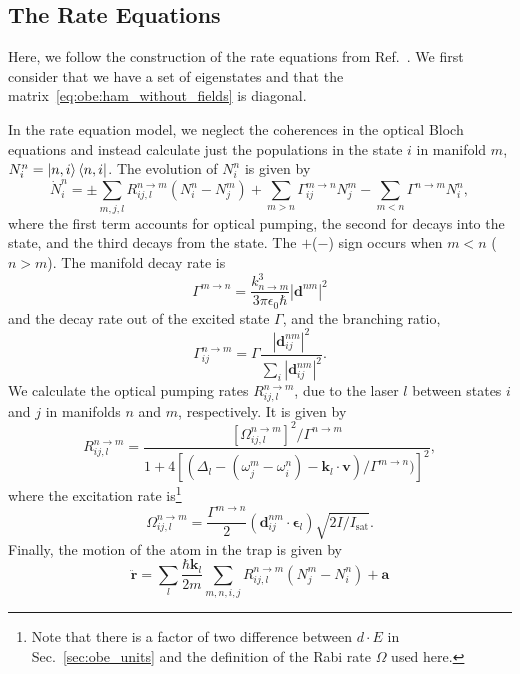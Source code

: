\documentclass[final,5p,times,twocolumn]{elsarticle}
\begin{document}
\subsection{The Rate Equations}
Here, we follow the construction of the rate equations from Ref.~\cite{Tarbutt2015}.  We first consider that we have a set of
eigenstates and that the matrix~\ref{eq:obe:ham_without_fields} is diagonal. 

In the rate equation model, we neglect the coherences in the optical Bloch equations and instead calculate just the populations in the state $i$ in manifold $m$, $N^n_i = \ket{n, i}\bra{n, i}$.  The evolution of $N^n_i$ is given by
\begin{equation}
    \dot{N}^n_i = \pm\sum_{m,j,l} R^{n\rightarrow m}_{ij,l} (N^n_i - N^m_j) + \sum_{m>n
    } \Gamma^{m\rightarrow n}_{ij} N^m_j - \sum_{m<n}\Gamma^{n\rightarrow m} N^n_i,
\end{equation}
where the first term accounts for optical pumping, the second for decays into the state, and the third decays from the state.  The $+$($-$) sign occurs when $m<n$ ($n>m$).  The manifold decay rate is 
\begin{equation}
	\Gamma^{m\rightarrow n} = \frac{k^3_{n\rightarrow m}}{3\pi\epsilon_0\hbar}|\mathbf{d}^{nm}|^2
\end{equation}
and the decay rate out of the excited state $\Gamma$, and the branching ratio,
\begin{equation}
    \Gamma_{ij}^{n\rightarrow m} = \Gamma \frac{\left|\mathbf{d}^{nm}_{ij}\right|^2}{\sum_i \left|\mathbf{d}^{nm}_{ij}\right|^2}.
\end{equation}
We calculate the optical pumping rates $R_{ij, l}^{n\rightarrow m}$, due to the laser $l$ between states $i$ and $j$ in manifolds $n$ and $m$, respectively.  It is given by
\begin{equation}
    \label{eq:rate_eq:pumping_rate}
    R_{ij,l}^{n\rightarrow m} = \frac{[\Omega^{n\rightarrow m}_{ij,l}]^2/\Gamma^{n\rightarrow m}}{1 + 4[(\Delta_l - (\omega^m_j-\omega^n_i) - \mathbf{k}_l\cdot \mathbf{v})/\Gamma^{m\rightarrow n})]^2},
\end{equation}
where the excitation rate is\footnote{Note that there is a factor of two difference between $d\cdot E$ in Sec.~\ref{sec:obe_units} and the definition of the Rabi rate $\Omega$ used here.}
\begin{equation}
	\Omega_{ij,l}^{n\rightarrow m} = \frac{\Gamma^{m\rightarrow n}}{2} (\mathbf{d}_{ij}^{nm}\cdot \boldsymbol{\epsilon}_l) \sqrt{2I/I_\text{sat}}.
\end{equation}
Finally, the motion of the atom in the trap is given by
\begin{equation}
	\mathbf{\ddot{r}} = \sum_{l} \frac{\hbar \mathbf{k}_l}{2m}\sum_{m, n, i,j} R_{ij,l}^{n\rightarrow m}(N^m_j - N^n_i) + \mathbf{a}
\end{equation}
\end{document}
